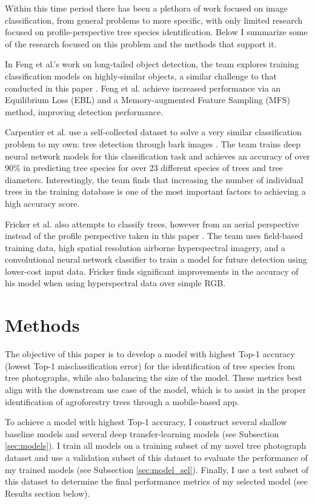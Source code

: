 \documentclass[10pt,twocolumn,letterpaper]{article}
\begin{document}
Within this time period there has been a plethora of work focused on image classification, from general problems to more specific, with only limited research focused on profile-perspective tree species identification. Below I summarize some of the research focused on this problem and the methods that support it. 

In Feng et al.'s work on long-tailed object detection, the team explores training classification models on highly-similar objects, a similar challenge to that conducted in this paper \cite{Feng_2021_ICCV}. Feng et al. achieve increased performance via an Equilibrium Loss (EBL) and a Memory-augmented Feature Sampling (MFS) method, improving detection performance.

Carpentier et al. use a self-collected dataset to solve a very similar classification problem to my own: tree detection through bark images \cite{Carpentier_2018}. The team trains deep neural network models for this classification task and achieves an accuracy of over 90\% in predicting tree species for over 23 different species of trees and tree diameters. Interestingly, the team finds that increasing the number of individual trees in the training database is one of the most important factors to achieving a high accuracy score.

Fricker et al. also attempts to classify trees, however from an aerial perspective instead of the profile perspective taken in this paper \cite{Fricker_RS_2019}. The team uses field-based training data, high spatial resolution airborne hyperspectral imagery, and a convolutional neural network classifier to train a model for future detection using lower-cost input data. Fricker finds significant improvements in the accuracy of his model when using hyperspectral data over simple RGB. 

\section{Methods}
\label{sec:methods}
The objective of this paper is to develop a model with highest Top-1 accuracy (lowest Top-1 misclassification error) for the identification of tree species from tree photographs, while also balancing the size of the model. These metrics best align with the downstream use case of the model, which is to assist in the proper identification of agroforestry trees through a mobile-based app. 

To achieve a model with highest Top-1 accuracy, I construct several shallow baseline models and several deep transfer-learning models (see Subsection \ref{sec:models}). I train all models on a training subset of my novel tree photograph dataset and use a validation subset of this dataset to evaluate the performance of my trained models (see Subsection \ref{sec:model_sel}). Finally, I use a test subset of this dataset to determine the final performance metrics of my selected model (see Results section below).  
\end{document}
